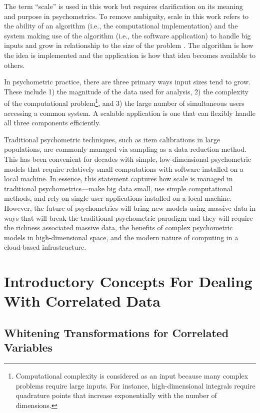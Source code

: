 \documentclass[12pt]{article}
\begin{document}
The term ``scale'' is used in this work but requires clarification on its meaning and purpose in psychometrics. To remove ambiguity, scale in this work refers to the ability of an algorithm (i.e., the computational implementation) and the system making use of the algorithm (i.e., the software application) to handle big inputs and grow in relationship to the size of the problem \cite{teng}. The algorithm is how the idea is implemented and the application is how that idea becomes available to others.

In psychometric practice, there are three primary ways input sizes tend to grow. These include 1) the magnitude of the data used for analysis, 2) the complexity of the computational problem\footnote{Computational complexity is considered as an input because many complex problems require large inputs. For instance, high-dimensional integrals require quadrature points that increase exponentially with the number of dimensions.}, and 3) the large number of simultaneous users accessing a common system. A scalable application is one that can flexibly handle all three components efficiently. 

Traditional psychometric techniques, such as item calibrations in large populations, are commonly managed via sampling as a data reduction method. This has been convenient for decades with simple, low-dimensional psychometric models that require relatively small computations with software installed on a local machine. In essence, this statement captures how scale is managed in traditional psychometrics---make big data small, use simple computational methods, and rely on single user applications installed on a local machine. However, the future of psychometrics will bring new models using massive data in ways that will break the traditional psychometric paradigm and they will require the richness associated massive data, the benefits of complex psychometric models in high-dimensional space, and the modern nature of computing in a cloud-based infrastructure.   

\section*{Introductory Concepts For Dealing With Correlated Data}

\subsection*{Whitening Transformations for Correlated Variables}
\end{document}
